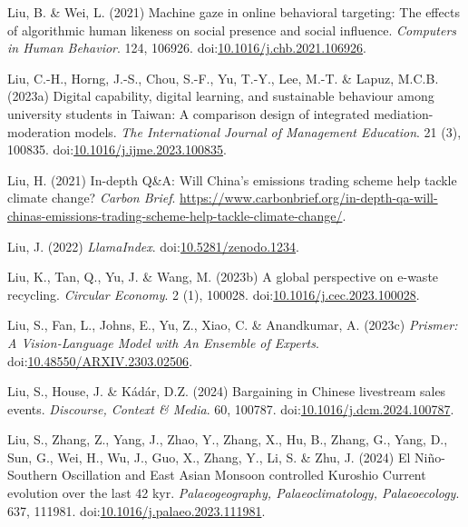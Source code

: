 \documentclass[
  letterpaper,
  DIV=11,
  numbers=noendperiod]{scrartcl}
\newlength{\cslhangindent}
\newenvironment{CSLReferences}[2] %
 {\begin{list}{}{%
  \setlength{\itemindent}{0pt}
  \setlength{\leftmargin}{0pt}
  \setlength{\parsep}{0pt}
  \ifodd #1
   \setlength{\leftmargin}{\cslhangindent}
   \setlength{\itemindent}{-1\cslhangindent}
  \fi
  \setlength{\itemsep}{#2\baselineskip}}}
 {\end{list}}
\begin{document}
\begin{CSLReferences}{0}{1}
Liu, B. \& Wei, L. (2021) Machine gaze in online behavioral targeting:
{The} effects of algorithmic human likeness on social presence and
social influence. \emph{Computers in Human Behavior}. 124, 106926.
doi:\href{https://doi.org/10.1016/j.chb.2021.106926}{10.1016/j.chb.2021.106926}.

Liu, C.-H., Horng, J.-S., Chou, S.-F., Yu, T.-Y., Lee, M.-T. \& Lapuz,
M.C.B. (2023a) Digital capability, digital learning, and sustainable
behaviour among university students in {Taiwan}: {A} comparison design
of integrated mediation-moderation models. \emph{The International
Journal of Management Education}. 21 (3), 100835.
doi:\href{https://doi.org/10.1016/j.ijme.2023.100835}{10.1016/j.ijme.2023.100835}.

Liu, H. (2021) In-depth {Q}\&{A}: {Will China}'s emissions trading
scheme help tackle climate change? \emph{Carbon Brief}.
\url{https://www.carbonbrief.org/in-depth-qa-will-chinas-emissions-trading-scheme-help-tackle-climate-change/}.

Liu, J. (2022) \emph{{LlamaIndex}}.
doi:\href{https://doi.org/10.5281/zenodo.1234}{10.5281/zenodo.1234}.

Liu, K., Tan, Q., Yu, J. \& Wang, M. (2023b) A global perspective on
e-waste recycling. \emph{Circular Economy}. 2 (1), 100028.
doi:\href{https://doi.org/10.1016/j.cec.2023.100028}{10.1016/j.cec.2023.100028}.

Liu, S., Fan, L., Johns, E., Yu, Z., Xiao, C. \& Anandkumar, A. (2023c)
\emph{Prismer: {A Vision-Language Model} with {An Ensemble} of
{Experts}}.
doi:\href{https://doi.org/10.48550/ARXIV.2303.02506}{10.48550/ARXIV.2303.02506}.

Liu, S., House, J. \& Kádár, D.Z. (2024) Bargaining in {Chinese}
livestream sales events. \emph{Discourse, Context \& Media}. 60, 100787.
doi:\href{https://doi.org/10.1016/j.dcm.2024.100787}{10.1016/j.dcm.2024.100787}.

Liu, S., Zhang, Z., Yang, J., Zhao, Y., Zhang, X., Hu, B., Zhang, G.,
Yang, D., Sun, G., Wei, H., Wu, J., Guo, X., Zhang, Y., Li, S. \& Zhu,
J. (2024) El {Ni{ñ}o-Southern Oscillation} and {East Asian Monsoon}
controlled {Kuroshio Current} evolution over the last 42 kyr.
\emph{Palaeogeography, Palaeoclimatology, Palaeoecology}. 637, 111981.
doi:\href{https://doi.org/10.1016/j.palaeo.2023.111981}{10.1016/j.palaeo.2023.111981}.


\end{CSLReferences}
\end{document}
